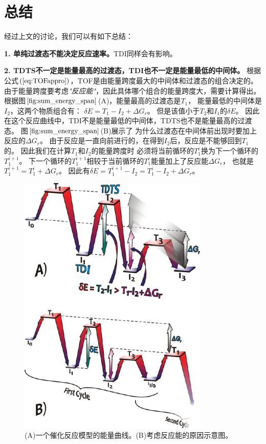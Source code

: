 \documentclass[a4paper,titlepage]{article}
\begin{document}
\section*{总结}
经过上文的讨论，我们可以有如下总结：

\textbf{1. 单纯过渡态不能决定反应速率。}TDI同样会有影响。

\textbf{2. TDTS不一定是能量最高的过渡态，TDI也不一定是能量最低的中间体。}
根据公式$(\ref{eq:TOFappro})$，TOF是由能量跨度最大的中间体和过渡态的组合决定的。
由于能量跨度要考虑\textit{"反应能"}，因此具体哪个组合的能量跨度大，需要计算得出。
根据图$\ref{fig:sum_energy_span}$(A)，能量最高的过渡态是$T_1$，
能量最低的中间体是$I_2$，这两个物质组合有：
$\delta{E}=T_1 - I_2 + \Delta{G}_r$。
但是该值小于$T_2$和$I_1$的$\delta{E}$。
因此在这个反应曲线中，TDI不是能量最低的中间体，TDTS也不是能量最高的过渡态。
图$\ref{fig:sum_energy_span}$(B)展示了
为什么过渡态在中间体前出现时要加上反应的$\Delta{G}_r$。
由于反应是一直向前进行的，在得到$I_2$后，反应是不能够回到$T_1$的。
因此我们在计算$T_1$和$I_2$的能量跨度时
必须将当前循环的$T_1^{i}$换为下一个循环的$T_1^{i+1}$。
下一个循环的$T_1^{i+1}$相较于当前循环的$T_1^{i}$能量加上了反应能$\Delta{G}_r$，
也就是$T_1^{i+1} = T_1^{i} + \Delta{G}_r$。
因此有$\delta{E} = T_1^{i+1} - I_2 =  T_1^{i} - I_2 + \Delta{G}_r$。
\begin{figure}[H]
  \centering
  \includegraphics[scale=0.5]{sum_energy_span}
  \caption{(A)一个催化反应模型的能量曲线。(B)考虑反应能的原因示意图。}
  \label{fig:sum_energy_span}
\end{figure}
\end{document}

